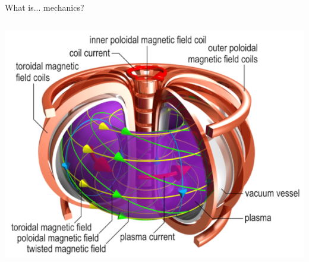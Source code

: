 \documentclass[handout,10pt]{beamer}
\begin{document}
\begin{frame}[t,fragile]{What is... mechanics?}
\begin{columns}
\begin{column}{.33\textwidth}
	   		\includegraphics[width=\textwidth]{Pictures/plasma} 	
		\end{column}
	\end{columns}
\end{frame}
\note[itemize]{
	\item
}
\end{document}
